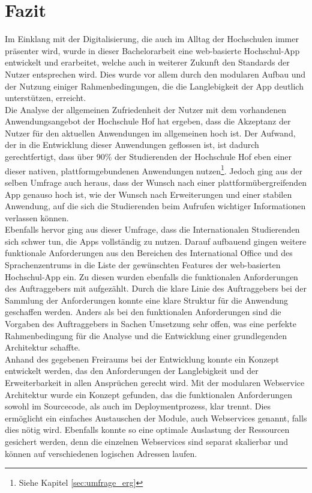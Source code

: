 \newpage
\section{Fazit\label{sec:fazit}}

Im Einklang mit der Digitalisierung, die auch im Alltag der Hochschulen immer präsenter wird, wurde in dieser Bachelorarbeit eine web-basierte Hochschul-\ac{App} entwickelt und erarbeitet, welche auch in weiterer Zukunft den Standards der Nutzer entsprechen wird. Dies wurde vor allem durch den modularen Aufbau und der Nutzung einiger Rahmenbedingungen, die die Langlebigkeit der \ac{App} deutlich unterstützen, erreicht. 
\\
\linebreak
Die Analyse der allgemeinen Zufriedenheit der Nutzer mit dem vorhandenen Anwendungsangebot der Hochschule Hof hat ergeben, dass die Akzeptanz der Nutzer für den aktuellen Anwendungen im allgemeinen hoch ist. Der Aufwand, der in die Entwicklung dieser Anwendungen geflossen ist, ist dadurch gerechtfertigt, dass über 90\% der Studierenden der Hochschule Hof eben einer dieser nativen, plattformgebundenen Anwendungen nutzen\footnote{Siehe Kapitel \ref{sec:umfrage_erg}}. Jedoch ging aus der selben Umfrage auch heraus, dass der Wunsch nach einer plattformübergreifenden \ac{App} genauso hoch ist, wie der Wunsch nach Erweiterungen und einer stabilen Anwendung, auf die sich die Studierenden beim Aufrufen wichtiger Informationen verlassen können.
\\
\linebreak
Ebenfalls hervor ging aus dieser Umfrage, dass die Internationalen Studierenden sich schwer tun, die \acp{App} vollständig zu nutzen. Darauf aufbauend gingen weitere funktionale Anforderungen aus den Bereichen des International Office und des Sprachenzentrums in die Liste der gewünschten Features der web-basierten Hochschul-\ac{App} ein. Zu diesen wurden ebenfalls die funktionalen Anforderungen des Auftraggebers mit aufgezählt. Durch die klare Linie des Auftraggebers bei der Sammlung der Anforderungen konnte eine klare Struktur für die Anwendung geschaffen werden. Anders als bei den funktionalen Anforderungen sind die Vorgaben des Auftraggebers in Sachen Umsetzung sehr offen, was eine perfekte Rahmenbedingung für die Analyse und die Entwicklung einer grundlegenden Architektur schaffte.
\\
\linebreak
Anhand des gegebenen Freiraums bei der Entwicklung konnte ein Konzept entwickelt werden, das den Anforderungen der Langlebigkeit und der Erweiterbarkeit in allen Ansprüchen gerecht wird. Mit der modularen Webservice Architektur wurde ein Konzept gefunden, das die funktionalen Anforderungen sowohl im Sourcecode, als auch im Deploymentprozess, klar trennt. Dies ermöglicht ein einfaches Austauschen der Module, auch Webservices genannt, falls dies nötig wird. Ebenfalls konnte so eine optimale Auslastung der Ressourcen gesichert werden, denn die einzelnen Webservices sind separat skalierbar und können auf verschiedenen logischen Adressen laufen. 
